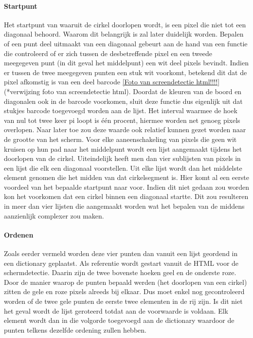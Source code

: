 		\paragraph{Startpunt} Het startpunt van waaruit de cirkel doorlopen wordt, is een pixel die niet tot een diagonaal behoord. Waarom dit belangrijk is zal later duidelijk worden. Bepalen of een punt deel uitmaakt van een diagonaal gebeurt aan de hand van een functie die controleerd of er zich tussen de desbetreffende pixel en een tweede meegegeven punt (in dit geval het middelpunt) een wit deel pixels bevindt. Indien er tussen de twee meegegeven punten een stuk wit voorkomt, betekend dit dat de pixel afkomstig is van een deel barcode \ref{Foto van screendetectie html!!!!} (*verwijzing foto van screendetectie html).
		Doordat de kleuren van de boord en diagonalen ook in de barcode voorkomen, sluit deze functie dus eigenlijk uit dat stukjes barcode toegevoegd worden aan de lijst. Het interval waarmee de hoek van nul tot twee keer pi loopt is één procent, hiermee worden net genoeg pixels overlopen. Naar later toe zou deze waarde ook relatief kunnen gezet worden naar de grootte van het scherm. Voor elke aaneenschakeling van pixels die geen wit kruisen op hun pad naar het middelpunt wordt een lijst aangemaakt tijdens het doorlopen van de cirkel. Uiteindelijk heeft men dan vier sublijsten van pixels in een lijst die elk een diagonaal voorstellen. Uit elke lijst wordt dan het middelste element genomen die het midden van dat cirkelsegment is. Hier komt al een eerste voordeel van het bepaalde startpunt naar voor. Indien dit niet gedaan zou worden kon het voorkomen dat een cirkel binnen een diagonaal startte. Dit zou resulteren in meer dan vier lijsten die aangemaakt worden wat het bepalen van de middens aanzienlijk complexer zou maken. 
		\paragraph{Ordenen} Zoals eerder vermeld worden deze vier punten dan vanuit een lijst geordend in een dictionary geplaatst. Als referentie wordt gestart vanuit de HTML voor de schermdetectie. Daarin zijn de twee bovenste hoeken geel en de onderste roze. Door de manier waarop de punten bepaald werden (het doorlopen van een cirkel) zitten de gele en roze pixels alreeds bij elkaar. Dus moet enkel nog gecontroleerd worden of de twee gele punten de eerste twee elementen in de rij zijn. Is dit niet het geval wordt de lijst geroteerd totdat aan de voorwaarde is voldaan. Elk element wordt dan in die volgorde toegevoegd aan de dictionary waardoor de punten telkens dezelfde ordening zullen hebben.
	
